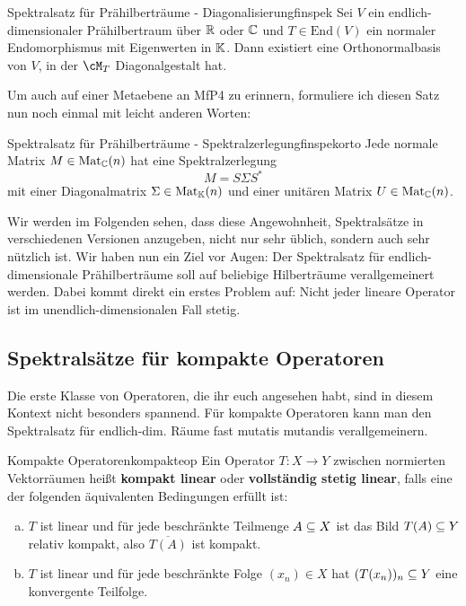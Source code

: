 \begin{theorem}{Spektralsatz für Prähilberträume - Diagonalisierung}{finspek}
Sei $V$ ein endlich-dimensionaler Prähilbertraum über $\mathbb{R}$ oder $\mathbb{C}$ und $T \in \text{End}(V)$ ein normaler Endomorphismus mit Eigenwerten in $\mathbb{K}$. Dann existiert eine Orthonormalbasis von $V$, in der $\cM_T$ Diagonalgestalt hat.
\end{theorem}
Um auch auf einer Metaebene an MfP4 zu erinnern, formuliere ich diesen Satz nun noch einmal mit leicht anderen Worten:
\begin{theorem}{Spektralsatz für Prähilberträume - Spektralzerlegung}{finspekorto}
Jede normale Matrix $M \in \text{Mat}_{\mathbb{C}}(n)$ hat eine Spektralzerlegung
\begin{equation}
M = S \Sigma S^\ast
\end{equation}
mit einer Diagonalmatrix $\Sigma \in \text{Mat}_{\mathbb{K}}(n)$ und einer unitären Matrix $U \in \text{Mat}_{\mathbb{C}}(n)$. 
\end{theorem}
Wir werden im Folgenden sehen, dass diese Angewohnheit, Spektralsätze in verschiedenen Versionen anzugeben, nicht nur sehr üblich, sondern auch sehr nützlich ist.
Wir haben nun ein Ziel vor Augen: Der Spektralsatz für endlich-dimensionale Prähilberträume soll auf beliebige Hilberträume verallgemeinert werden. Dabei kommt direkt ein erstes Problem auf: Nicht jeder lineare Operator ist im unendlich-dimensionalen Fall stetig.
\subsection{Spektralsätze für kompakte Operatoren}
\label{subsec:kompaktspekt}

Die erste Klasse von Operatoren, die ihr euch angesehen habt, sind in diesem Kontext nicht besonders spannend. Für kompakte Operatoren kann man den Spektralsatz für endlich-dim. Räume fast mutatis mutandis verallgemeinern.

\begin{definition}{Kompakte Operatoren}{kompakteop}
Ein Operator $T: X \to Y$ zwischen normierten Vektorräumen heißt \textbf{kompakt linear} oder \textbf{vollständig stetig linear}, falls eine der folgenden äquivalenten Bedingungen erfüllt ist:
\begin{enumerate}[(a)]
\item $T$ ist linear und für jede beschränkte Teilmenge $A \subseteq X$ ist das Bild $T(A) \subseteq Y$ relativ kompakt, also $\overline{T(A)}$ ist kompakt.
\item $T$ ist linear und für jede beschränkte Folge $(x_n) \in X$ hat $(T(x_n))_n \subseteq Y$ eine konvergente Teilfolge.
\end{enumerate}
\end{definition}

